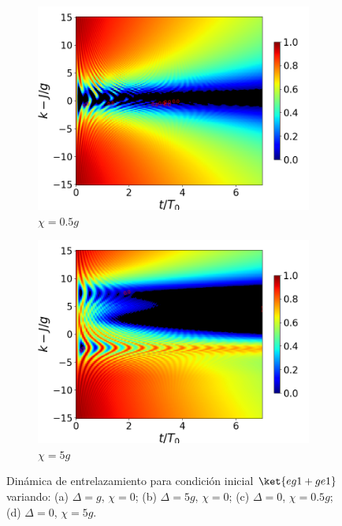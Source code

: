 \begin{figure}[h!]
    \begin{subfigure}{0.49\textwidth}
        \includegraphics[width=\textwidth]{figuras/ch4/concu/k/eg1+ge1 d=0.0g x=0.5g J=15.0g gamma=0.25g concu k dis.png}
        \caption{$\chi=0.5g$}
        \label{fig4:concu k 1 x1}
    \end{subfigure}
    \hfill
    \begin{subfigure}{0.49\textwidth}
        \includegraphics[width=\textwidth]{figuras/ch4/concu/k/eg1+ge1 d=0.0g x=5.0g J=15.0g gamma=0.25g concu k dis.png}
        \caption{$\chi=5g$}
        \label{fig4:concu k 1 x2}
    \end{subfigure}
    \caption{Dinámica de entrelazamiento para condición inicial $\ket{eg1+ge1}$ variando: (a) $\Delta=g$, $\chi=0$; (b) $\Delta=5g$, $\chi=0$; (c) $\Delta=0$, $\chi=0.5g$; (d) $\Delta=0$, $\chi=5g$.}
    \label{fig4:concu k params 1}
\end{figure}


